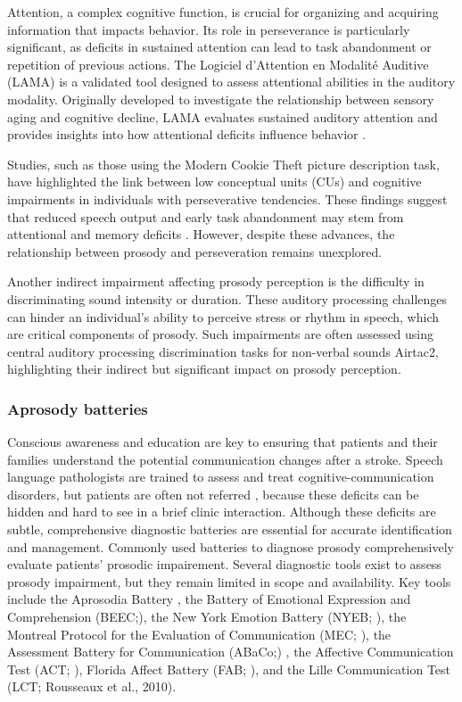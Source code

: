 Attention, a complex cognitive function, is crucial for organizing and acquiring information that impacts behavior. Its role in perseverance is particularly significant, as deficits in sustained attention can lead to task abandonment or repetition of previous actions. The Logiciel d’Attention en Modalité Auditive (LAMA) is a validated tool designed to assess attentional abilities in the auditory modality. Originally developed to investigate the relationship between sensory aging and cognitive decline, LAMA evaluates sustained auditory attention and provides insights into how attentional deficits influence behavior \cite{ambert-dahan_capacites_2013}.

Studies, such as those using the Modern Cookie Theft picture description task, have highlighted the link between low conceptual units (CUs) and cognitive impairments in individuals with perseverative tendencies. These findings suggest that reduced speech output and early task abandonment may stem from attentional and memory deficits \cite{berube_analysis_2022}. However, despite these advances, the relationship between prosody and perseveration remains unexplored.

Another indirect impairment affecting prosody perception is the difficulty in discriminating sound intensity or duration. These auditory processing challenges can hinder an individual’s ability to perceive stress or rhythm in speech, which are critical components of prosody. Such impairments are often assessed using central auditory processing discrimination tasks for non-verbal sounds  Airtac2\cite{tessier_c_et_weill-chounlamountry_a_aide_2014}, highlighting their indirect but significant impact on prosody perception.
\subsubsection {Aprosody batteries}
Conscious awareness and education are key to ensuring that patients and their families understand the potential communication changes after a stroke. Speech language pathologists are trained to assess and treat cognitive-communication disorders, but patients are often not referred \cite{blake_prevalence_2002}, because these deficits can be hidden and hard to see in a brief clinic interaction. 
Although these deficits are subtle, comprehensive diagnostic batteries are essential for accurate identification and management. Commonly used batteries to diagnose prosody comprehensively evaluate patients' prosodic impairement.
Several diagnostic tools exist to assess prosody impairment, but they remain limited in scope and availability. Key tools include the Aprosodia Battery \cite{ross_lateralization_1997}, the Battery of Emotional Expression and Comprehension (BEEC;\cite{cancelliere_lesion_1990}), the New York Emotion Battery (NYEB;\cite{borod_j_welkowitz_j__obler_l_new_1992} ), the Montreal Protocol for the Evaluation of Communication (MEC; \cite{joanette_y_ska_b_et_ct_h_protocole_2004}), the Assessment Battery for Communication (ABaCo;\cite{angeleri_communicative_2008}) , the Affective Communication Test (ACT; \cite{friedman_understanding_1980}), Florida Affect Battery (FAB; \cite{walch_florida_1998}), and the Lille Communication Test (LCT; \cite{noauthor_communication_nodate}Rousseaux et al., 2010). 


